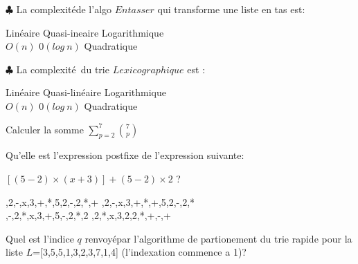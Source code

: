 \documentclass[addpoints]{exam}
\newcommand{\e}{\'{e}}
\begin{document}
\begin{questions}
\question
$\clubsuit$ La complexit\e de l'algo $Entasser$ qui transforme une liste en tas est:

\begin{oneparchoices}
\CorrectChoice Lin\e aire
\choice Quasi-ineaire
\choice Logarithmique
\\
\CorrectChoice $O(n)$
\choice $0(log\: n)$
\choice Quadratique
\end{oneparchoices}

\question
$\clubsuit$ La complexit\e \ du trie $Lexicographique$ est :

\begin{oneparchoices}
\CorrectChoice Lin\e aire
\choice Quasi-lin\e aire
\choice Logarithmique
\\
\CorrectChoice $O(n)$
\choice $0(log\: n)$
\choice Quadratique
\end{oneparchoices}


\question
Calculer la  somme $\sum_{p=2}^{7} \binom{7}{p}$

\begin{oneparchoices}

\end{oneparchoices}
\question
Qu'elle est l'expression postfixe de l'expression suivante:
\begin{center}
    $[(5-2)\times(x+3)]+(5-2)\times2 $ ?
\end{center}


\begin{oneparchoices}
,2,-,x,3,+,*,5,2,-,2,*,+
,2,-,x,3,+,*,+,5,2,-,2,*
\\
,-,2,*,x,3,+,5,-,2,*,2
,2,*,x,3,2,2,*,+,-,+
\end{oneparchoices}



\question
Quel est l'indice $q$ renvoy\e  par l'algorithme  de partionement du trie rapide pour la liste $L$=[3,5,5,1,3,2,3,7,1,4] (l'indexation commence a 1)?

\begin{oneparchoices}
\end{oneparchoices}




\end{questions}
\end{document}
